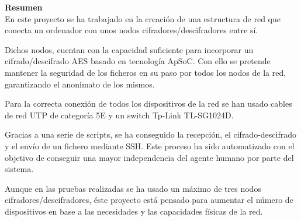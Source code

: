 \begin{center}
	\bigskip
	\bigskip
	\textbf{\huge {Resumen}}\\
	\bigskip
	En este proyecto se ha trabajado en la creación de una estructura de red que conecta un ordenador con unos nodos cifradores/descifradores entre sí.
	
	Dichos nodos, cuentan con la capacidad suficiente para incorporar un cifrado/descifrado AES basado en tecnología ApSoC. Con ello se pretende mantener la seguridad de los ficheros en su paso por todos los nodos de la red, garantizando el anonimato de los mismos.
	
	Para la correcta conexión de todos los dispositivos de la red se han usado cables de red UTP de categoría 5E y un switch Tp-Link TL-SG1024D.

	Gracias a una serie de scripts, se ha conseguido la recepción, el cifrado-descifrado y el envío de un fichero mediante SSH. Este proceso ha sido automatizado con el objetivo de conseguir una mayor independencia del agente humano por parte del sistema.
	
	Aunque en las pruebas realizadas se ha usado un máximo de tres nodos cifradores/descifradores, éste proyecto está pensado para aumentar el número de dispositivos en base a las necesidades y las capacidades físicas de la red.
	
\end{center}

